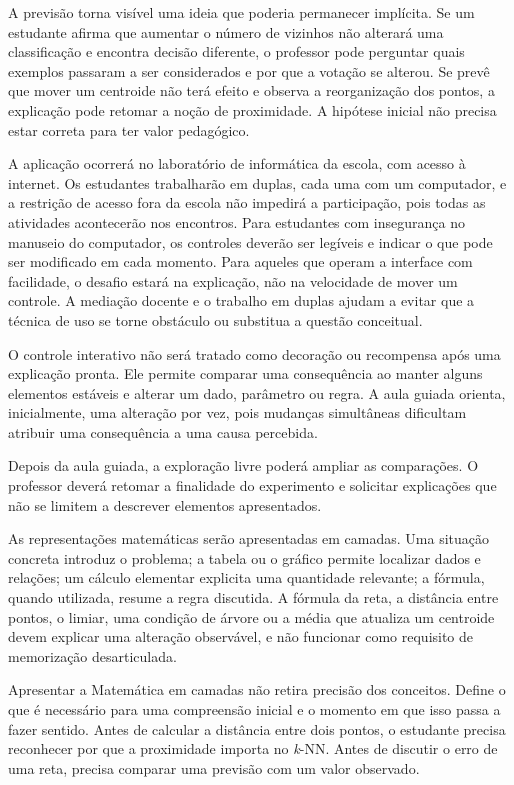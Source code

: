 A previsão torna visível uma ideia que poderia permanecer implícita. Se um estudante afirma que aumentar o número de vizinhos não alterará uma classificação e encontra decisão diferente, o professor pode perguntar quais exemplos passaram a ser considerados e por que a votação se alterou. Se prevê que mover um centroide não terá efeito e observa a reorganização dos pontos, a explicação pode retomar a noção de proximidade. A hipótese inicial não precisa estar correta para ter valor pedagógico.

A aplicação ocorrerá no laboratório de informática da escola, com acesso à internet. Os estudantes trabalharão em duplas, cada uma com um computador, e a restrição de acesso fora da escola não impedirá a participação, pois todas as atividades acontecerão nos encontros. Para estudantes com insegurança no manuseio do computador, os controles deverão ser legíveis e indicar o que pode ser modificado em cada momento. Para aqueles que operam a interface com facilidade, o desafio estará na explicação, não na velocidade de mover um controle. A mediação docente e o trabalho em duplas ajudam a evitar que a técnica de uso se torne obstáculo ou substitua a questão conceitual.

O controle interativo não será tratado como decoração ou recompensa após uma explicação pronta. Ele permite comparar uma consequência ao manter alguns elementos estáveis e alterar um dado, parâmetro ou regra. A aula guiada orienta, inicialmente, uma alteração por vez, pois mudanças simultâneas dificultam atribuir uma consequência a uma causa percebida.

Depois da aula guiada, a exploração livre poderá ampliar as comparações. O professor deverá retomar a finalidade do experimento e solicitar explicações que não se limitem a descrever elementos apresentados.

As representações matemáticas serão apresentadas em camadas. Uma situação concreta introduz o problema; a tabela ou o gráfico permite localizar dados e relações; um cálculo elementar explicita uma quantidade relevante; a fórmula, quando utilizada, resume a regra discutida. A fórmula da reta, a distância entre pontos, o limiar, uma condição de árvore ou a média que atualiza um centroide devem explicar uma alteração observável, e não funcionar como requisito de memorização desarticulada.

Apresentar a Matemática em camadas não retira precisão dos conceitos. Define o que é necessário para uma compreensão inicial e o momento em que isso passa a fazer sentido. Antes de calcular a distância entre dois pontos, o estudante precisa reconhecer por que a proximidade importa no \textit{k}-NN. Antes de discutir o erro de uma reta, precisa comparar uma previsão com um valor observado.

